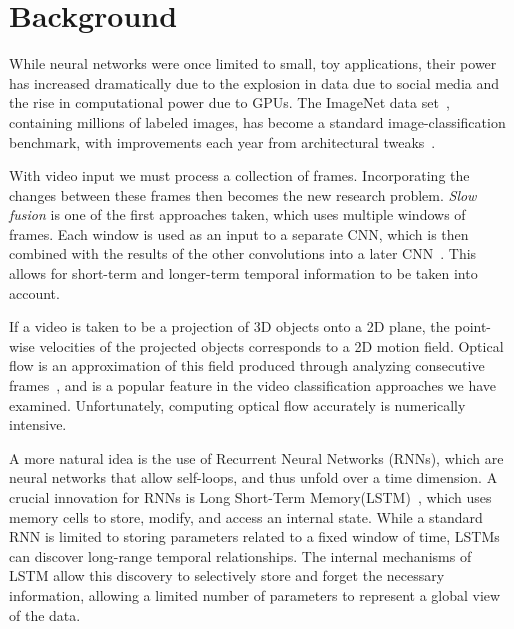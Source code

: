 \section{Background}
While neural networks were once limited to small, toy applications, 
their power has increased dramatically due to the explosion in data 
due to social media and the rise in computational power due to GPUs. 
The ImageNet data set~\cite{imagenet}, containing millions of labeled images, has become a standard image-classification benchmark, with improvements each year from architectural tweaks~\cite{alexnet,vggnet,nin,resnet}.

With video input we must process a collection of frames. Incorporating the changes between these frames then becomes the new research problem. \emph{Slow fusion} is one of the first approaches taken, which uses multiple windows of frames. Each window is used as an input to a separate CNN, which is then combined with the results of the other convolutions into a later CNN~\cite{cnnvid}. This allows for short-term and longer-term temporal information to be taken into account. 

If a video is taken to be a projection of 3D objects onto a 2D plane, the point-wise velocities of the projected objects corresponds to a 2D motion field. Optical flow is an approximation of this field produced through analyzing consecutive frames~\cite{brox}, and is a popular feature in the video classification approaches we have examined. Unfortunately, computing optical flow accurately is numerically intensive. 

A more natural idea is the use of Recurrent Neural Networks (RNNs), which are neural networks that allow self-loops, and thus unfold over a time dimension. A crucial innovation for RNNs is Long Short-Term Memory(LSTM)~\cite{LSTM}, which uses memory cells to store, modify,
and access an internal state. While a standard RNN is limited to storing parameters related to a fixed window of time, LSTMs can discover long-range
temporal relationships. The internal mechanisms of LSTM allow this discovery to selectively store and forget the necessary information, allowing a limited number of parameters to represent a global view of the data. 

